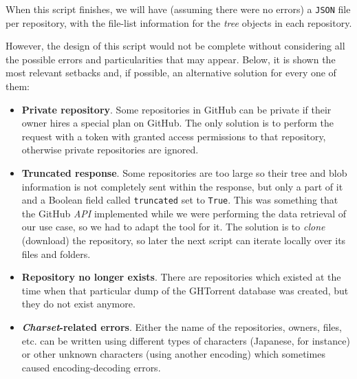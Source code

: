 \documentclass[a4paper, 12pt]{book}
\begin{document}
When this script finishes, we will have (assuming there were no errors) a \texttt{JSON} file per repository,
with the file-list information for the \textit{tree} objects in each repository.

However, the design of this script would not be complete without considering all the possible errors and
particularities that may appear. Below, it is shown the most relevant setbacks and, if possible, an alternative
solution for every one of them:
\begin{itemize}
  \item \textbf{Private repository}. Some repositories in GitHub can be private if their owner hires a special
  plan on GitHub. The only solution is to perform the request with
  a token with granted access permissions to that repository, otherwise private repositories are ignored.
  \item \textbf{Truncated response}. Some repositories are too large so their tree and blob information is not completely
  sent within the response, but only a part of it and a Boolean field called \texttt{truncated} set to \texttt{True}.
  This was something that the GitHub \textit{API} implemented while we were performing the data retrieval of our
  use case, so we had to adapt the tool for it. The solution is to \textit{clone} (download) the repository,
  so later the next script can iterate locally over its files and folders.
  \item \textbf{Repository no longer exists}. There are repositories which existed at the time when that particular
  dump of the GHTorrent database was created, but they do not exist anymore.
  \item \textbf{\textit{Charset}-related errors}. Either the name of the repositories, owners, files, etc. can be written
  using different types of characters (Japanese, for instance) or other unknown characters (using another encoding)
  which sometimes caused encoding-decoding errors.
\end{itemize}
\label{sec:data-extraction}
\end{document}
